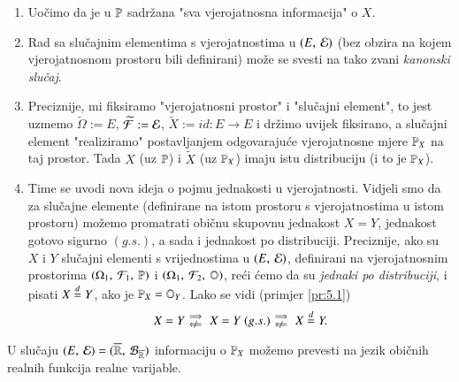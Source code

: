 \begin{nap} \label{nap:5.3}
    \quad
    \begin{enumerate}[label=(\alph*)]
        \item Uo\v cimo da je u $\mathbb{P}$ sadr\v zana "sva vjerojatnosna informacija" o $X$.
        \item Rad sa slu\v cajnim elementima s vjerojatnostima u $({E}, \: {\mathcal{E}})$ (bez obzira na kojem vjerojatnosnom prostoru bili definirani) mo\v ze se svesti na tako zvani \emph{kanonski slu\v caj}.
        \item Preciznije, mi fiksiramo "vjerojatnosni prostor" i "slu\v cajni element", to jest uzmemo $\widetilde{\Omega} := E$, $\widetilde{\mathcal{F}} := \mathcal{E}$, $\widetilde{X} := id : E \to E$ i dr\v zimo uvijek fiksirano, a slu\v cajni element "realiziramo" postavljanjem odgovaraju\' ce vjerojatnosne mjere $\mathbb{P}_X$ na taj prostor.
        Tada $X$ (uz $\mathbb{P}$) i $\widetilde{X}$ (uz $\mathbb{P}_X$) imaju istu distribuciju (i to je $\mathbb{P}_X$).
        \item Time se uvodi nova ideja o pojmu jednakosti u vjerojatnosti.
        Vidjeli smo da za slu\v cajne elemente (definirane na istom prostoru s vjerojatnostima u istom prostoru) mo\v zemo promatrati obi\v cnu skupovnu jednakost $X = Y$, jednakost gotovo sigurno $(g.s.)$, a sada i jednakost po distribuciji.
        Preciznije, ako su $X$ i $Y$ slu\v cajni elementi s vrijednostima u $({E}, \: {\mathcal{E}})$, definirani na vjerojatnosnim prostorima $(\Omega_1, \: \mathcal{F}_1, \: \mathbb{P})$ i $(\Omega_1, \: \mathcal{F}_2, \: \mathbb{O})$, re\' ci \' cemo da su \emph{jednaki po distribuciji}, i pisati $X \overset{d}{=} Y$, ako je $\mathbb{P}_X = \mathbb{O}_Y$.
        Lako se vidi (primjer \ref{pr:5.1})
        \begin{equation*}
            X = Y
            \begin{smallmatrix}
                \implies&  \\
                \notimpliedby&
            \end{smallmatrix}
            X = Y \; (g.s.)
            \begin{smallmatrix}
                \implies&  \\
                \notimpliedby&
            \end{smallmatrix}
            X \distJed Y.
        \end{equation*}
    \end{enumerate}
\end{nap}

U slu\v caju $({E}, \: {\mathcal{E}}) = ({\overline{\mathbb{R}}}, \: {\mathcal{B}_{\overline{\mathbb{R}}}})$ informaciju o $\mathbb{P}_X$ mo\v zemo prevesti na jezik obi\v cnih realnih funkcija realne varijable.

